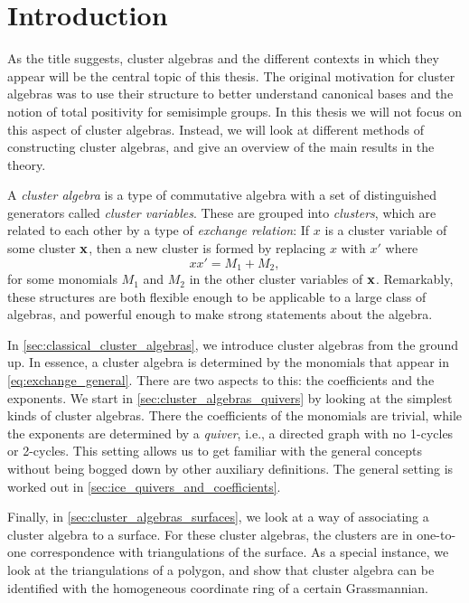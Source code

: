 \chapter*{Introduction}

As the title suggests, cluster algebras and the different contexts in which they appear
will be the central topic of this thesis. The original motivation for cluster algebras
was to use their structure to better understand canonical bases and the notion of total
positivity for semisimple groups. In this thesis we will not focus on this aspect of
cluster algebras. Instead, we will look at different methods of constructing cluster
algebras, and give an overview of the main results in the theory.

A \emph{cluster algebra} is a type of commutative algebra with a set of distinguished
generators called \emph{cluster variables}. These are grouped into \emph{clusters},
which are related to each other by a type of \emph{exchange relation}: If $x$ is a
cluster variable of some cluster $\mathbf{x}$, then a new cluster is formed by replacing $x$
with $x'$ where
\begin{equation}\label{eq:exchange_general}
	x x' = M_{1} + M_{2}\tag{$*$},
\end{equation}
%
for some monomials $M_1$ and $M_2$ in the other cluster variables of $\mathbf{x}$. Remarkably,
these structures are both flexible enough to be applicable to a large class of
algebras, and powerful enough to make strong statements about the algebra.

\medskip

In \cref{sec:classical_cluster_algebras}, we introduce cluster algebras from the ground
up. In essence, a cluster algebra is determined by the monomials that appear in
\cref{eq:exchange_general}. There are two aspects to this: the coefficients and the
exponents. We start in \cref{sec:cluster_algebras_quivers} by looking at the simplest
kinds of cluster algebras. There the coefficients of the monomials are trivial, while
the exponents are determined by a \emph{quiver}, i.e., a directed graph with no
1-cycles or 2-cycles. This setting allows us to get familiar with the general concepts
without being bogged down by other auxiliary definitions. The general setting is worked
out in \cref{sec:ice_quivers_and_coefficients}.

Finally, in \cref{sec:cluster_algebras_surfaces}, we look at a way of associating a
cluster algebra to a surface. For these cluster algebras, the clusters are in
one-to-one correspondence with triangulations of the surface. As a special instance, we
look at the triangulations of a polygon, and show that cluster algebra can be
identified with the homogeneous coordinate ring of a certain Grassmannian.

